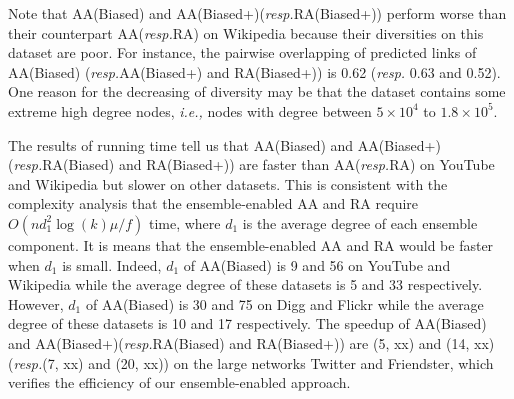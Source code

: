 \documentclass[10pt,journal,compsoc]{IEEEtran}
\newcommand{\Aa}{{\sf AA}\xspace }
\newcommand{\RA}{{\sf RA}\xspace }
\newcommand{\Digg}{{\sf Digg}\xspace}
\newcommand{\YouTube}{{\sf YouTube}\xspace}
\newcommand{\Flickr}{{\sf Flickr}\xspace}
\newcommand{\Wikipedia}{{\sf Wikipedia}\xspace}
\newcommand{\Twitter}{{\sf Twitter}\xspace}
\newcommand{\Friendster}{{\sf Friendster}\xspace}
\newcommand{\AABiased}{{\sf AA(Biased)}\xspace}
\newcommand{\AABiasedp}{{\sf AA(Biased+)}\xspace}
\newcommand{\RABiased}{{\sf RA(Biased)}\xspace}
\newcommand{\RABiasedp}{{\sf RA(Biased+)}\xspace}
\newcommand{\ie}{\emph{i.e.,}\xspace}
\newcommand{\resp}{\emph{resp.}\xspace}
\begin{document}
Note that \AABiased and \AABiasedp (\resp \RABiasedp)
perform worse than their counterpart \Aa (\resp \RA) on \Wikipedia because their diversities
on this dataset are poor. For instance, the pairwise overlapping of predicted links of \AABiased
(\resp \AABiasedp and \RABiasedp) is 0.62 (\resp 0.63 and 0.52). One reason for the decreasing
of diversity may be that the dataset contains some extreme high degree nodes,
\ie nodes with degree between $5 \times 10^4$ to $1.8 \times 10^5$.

The results of running time tell us that \AABiased and \AABiasedp (\resp \RABiased and \RABiasedp)
are faster than \Aa (\resp \RA) on \YouTube and \Wikipedia but
slower on other datasets. This is consistent with the complexity analysis
that the ensemble-enabled \Aa and \RA require $O(nd_{1}^{2}\log(k)\mu/f)$ time,
where $d_1$ is the average degree of each ensemble component. It is means
that the ensemble-enabled \Aa and \RA would be faster when $d_1$ is small.
Indeed, $d_1$ of \AABiased is 9 and 56 on \YouTube and \Wikipedia while the average
degree of these datasets is 5 and 33 respectively. However, $d_1$ of \AABiased is 30 and 75
on \Digg and \Flickr while the average degree of these datasets is 10 and 17 respectively.
The speedup of \AABiased and \AABiasedp (\resp \RABiased and \RABiasedp) are (5, xx) and (14, xx) 
(\resp (7, xx) and (20, xx)) on the large networks \Twitter and \Friendster, which verifies the efficiency 
of our ensemble-enabled approach.





\begin{footnotesize}


\end{footnotesize}
\end{document}
